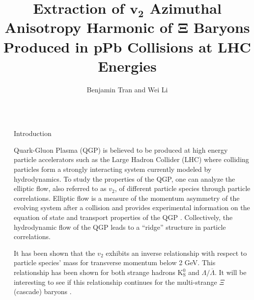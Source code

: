 \documentclass[final]{beamer}
\title{Extraction of $ \boldsymbol{v_{2}} $ Azimuthal Anisotropy Harmonic of $
\boldsymbol{\Xi} $ Baryons\\ Produced in pPb Collisions at LHC Energies} %
\author{Benjamin Tran and Wei Li} %
\institute{Bonner Nuclear Laboratories, Rice University} %
\newlength{\sepwid}
\newlength{\onecolwid}
\begin{document}

\setlength{\belowcaptionskip}{2ex} %
\setlength\belowdisplayshortskip{2ex} %

\begin{frame}[t] %

\begin{columns}[t] %

\begin{column}{\sepwid}\end{column} %

\begin{column}{\onecolwid} %



\begin{block}{Introduction}

Quark-Gluon Plasma (QGP)
is believed to be produced at high energy particle accelerators such as the
Large Hadron Collider (LHC) where colliding particles form a strongly
interacting system currently modeled by hydrodynamics. To study the properties
of the QGP, one can analyze the elliptic flow, also referred to as  $ v_{2} $,
of different particle species through particle correlations. Elliptic flow is a measure of the momentum
asymmetry of the evolving system after a collision and provides experimental
information on the equation of state and transport properties of the QGP
\cite{Snellings}. Collectively, the hydrodynamic flow of the QGP leads to a
``ridge'' structure in particle correlations.\par 
It has been shown that the $ v_{2} $ exhibits an inverse relationship with
respect to particle species' mass for transverse momentum below 2 GeV. This
relationship has been shown for both strange hadrons $ \mathrm{K}_{\mathrm{S}}^{0}
$ and $ \Lambda/\overline{\Lambda} $. It will be interesting to see if
this relationship continues for the multi-strange $ \Xi $ (cascade) baryons
\cite{Zhenyu}.



\end{block}
\end{column}
\end{columns}
\end{frame}
\end{document}
